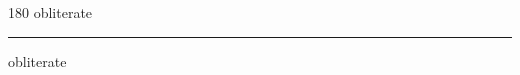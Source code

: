 
\begin{frame}
\begin{center}
\begin{turn}{180}
{\fontsize{2.5cm}{1em}\selectfont obliterate}
\end{turn}
\vspace{1em}\par  
\hrule
\vspace{1em}\par  
{\fontsize{2.5cm}{1em}\selectfont obliterate}
\end{center}
\end{frame}
